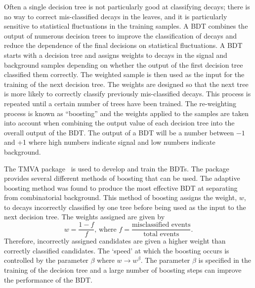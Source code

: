 Often a single decision tree is not particularly good at classifying decays; there is no way to correct mis-classified decays in the leaves, and it is particularly sensitive to statistical fluctuations in the training samples. A BDT combines the output of numerous decision trees to improve the classification of decays and reduce the dependence of the final decisions on statistical fluctuations. A BDT starts with a decision tree and assigns weights to decays in the signal and background samples depending on whether the output of the first decision tree classified them correctly. The weighted sample is then used as the input for the training of the next decision tree. The weights are designed so that the next tree is more likely to correctly classify previously mis-classified decays. This process is repeated until a certain number of trees have been trained. The re-weighting process is known as ``boosting'' and the weights applied to the samples are taken into account when combining the output value of each decision tree into the overall output of the BDT. The output of a BDT will be a number between $-1$ and +1 where high numbers indicate signal and low numbers indicate background.


The TMVA package~\cite{Hocker:2007ht} is used to develop and train the BDTs. The package provides several different methods of boosting that can be used. The adaptive boosting method was found to produce the most effective BDT at separating \bmumu from combinatorial background.
This method of boosting assigns the weight, $w$, to decays incorrectly classified by one tree before being used as the input to the next decision tree. The weights assigned are given by
\begin{equation}
w = \frac{1 - f}{f}\text{, where } f = \frac{\text{misclassified events}}{\text{total events}}.
\end{equation}
Therefore, incorrectly assigned candidates are given a higher weight than correctly classified candidates. The `speed’ at which the boosting occurs is controlled by the parameter $\beta$ where $w \rightarrow w^{\beta}$. The parameter $\beta$ is specified in the training of the decision tree and a large number of boosting steps can improve the performance of the BDT.

